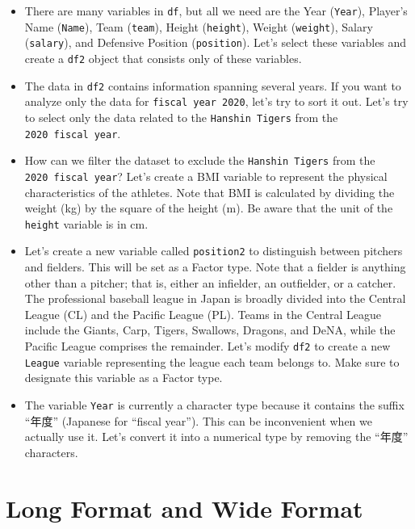\documentclass[
  a4paper,
]{book}
\providecommand{\tightlist}{%
  \setlength{\itemsep}{0pt}\setlength{\parskip}{0pt}}\usepackage{longtable,booktabs,array}
\begin{document}
\begin{itemize}
\tightlist
\item
  There are many variables in \texttt{df}, but all we need are the Year
  (\texttt{Year}), Player's Name (\texttt{Name}), Team (\texttt{team}),
  Height (\texttt{height}), Weight (\texttt{weight}), Salary
  (\texttt{salary}), and Defensive Position (\texttt{position}). Let's
  select these variables and create a \texttt{df2} object that consists
  only of these variables.
\item
  The data in \texttt{df2} contains information spanning several years.
  If you want to analyze only the data for \texttt{fiscal\ year\ 2020},
  let's try to sort it out. Let's try to select only the data related to
  the \texttt{Hanshin\ Tigers} from the \texttt{2020\ fiscal\ year}.
\item
  How can we filter the dataset to exclude the \texttt{Hanshin\ Tigers}
  from the \texttt{2020\ fiscal\ year}? Let's create a BMI variable to
  represent the physical characteristics of the athletes. Note that BMI
  is calculated by dividing the weight (kg) by the square of the height
  (m). Be aware that the unit of the \texttt{height} variable is in cm.
\item
  Let's create a new variable called \texttt{position2} to distinguish
  between pitchers and fielders. This will be set as a Factor type. Note
  that a fielder is anything other than a pitcher; that is, either an
  infielder, an outfielder, or a catcher. The professional baseball
  league in Japan is broadly divided into the Central League (CL) and
  the Pacific League (PL). Teams in the Central League include the
  Giants, Carp, Tigers, Swallows, Dragons, and DeNA, while the Pacific
  League comprises the remainder. Let's modify \texttt{df2} to create a
  new \texttt{League} variable representing the league each team belongs
  to. Make sure to designate this variable as a Factor type.
\item
  The variable \texttt{Year} is currently a character type because it
  contains the suffix ``年度'' (Japanese for ``fiscal year''). This can
  be inconvenient when we actually use it. Let's convert it into a
  numerical type by removing the ``年度'' characters.
\end{itemize}

\section{Long Format and Wide Format}\label{long-format-and-wide-format}
\end{document}
